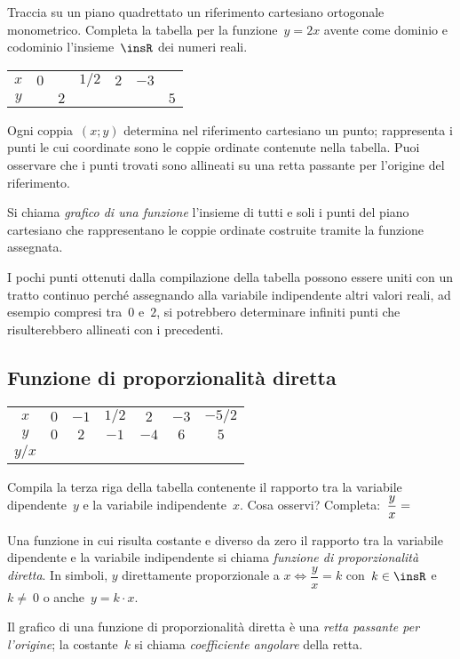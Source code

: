 \begin{exrig}
 \begin{esempio}
Traccia su un piano quadrettato un riferimento cartesiano ortogonale monometrico.
Completa la tabella per la funzione~$y=2x$ avente come dominio e codominio l'insieme~$\insR$ dei numeri reali.
\begin{center}
 \begin{tabular}{ccccccc}
 \toprule
 $x$ & $0$ && $1/2$ & $2$ & $-3$ &\\
 $y$ &&$2$&&&&$5$\\
 \bottomrule
 \end{tabular}
\end{center}
Ogni coppia~$(x;y)$ determina nel riferimento cartesiano un punto; rappresenta i punti le cui coordinate sono
le coppie ordinate contenute nella tabella. Puoi osservare che i punti trovati sono allineati su una retta passante
per l'origine del riferimento.
 \end{esempio}
\end{exrig}
\begin{definizione}
 Si chiama \emph{grafico di una funzione} l'insieme di tutti e soli i punti del piano cartesiano che
 rappresentano le coppie ordinate costruite tramite la funzione assegnata.
\end{definizione}
\osservazione
I pochi punti ottenuti dalla compilazione della tabella possono essere uniti con un tratto continuo perché
assegnando alla variabile indipendente altri valori reali, ad esempio compresi tra~$0$ e~$2$, si potrebbero
determinare infiniti punti che risulterebbero allineati con i precedenti.

\vspazio\ovalbox{\risolvii \ref{ese:D.37}, \ref{ese:D.38}}

\subsection{Funzione di proporzionalità diretta}
\begin{center}
 \begin{tabular}{ccccccc}
 \toprule
 $x$ & $0$ & $-1$ & $ 1/2$ & $2$ & $-3$ & $-5/2$\\
 $y$ & $0$ & $2$ & $-1$ & $-4$ & $6$ & $5$\\
 \midrule
 $y/x$ & & & & & & \\
 \bottomrule
 \end{tabular}
\end{center}
Compila la terza riga della tabella contenente il rapporto tra la variabile dipendente~$y$ e la variabile indipendente~$x$.
Cosa osservi? Completa:~$\dfrac{y}{x}=\dotfill$
\begin{definizione}
 Una funzione in cui risulta costante e diverso da zero il rapporto tra la variabile dipendente e la variabile indipendente
 si chiama \emph{funzione di proporzionalità diretta}. In simboli, $y$ direttamente proporzionale a
$x \Leftrightarrow \dfrac{y}{x}=k$ con~$k\in \insR$ e~$k\neq~0$ o anche~$y=k\cdot x$.
\end{definizione}
Il grafico di una funzione di proporzionalità diretta è una \emph{retta passante per l'origine};
la costante~$k$ si chiama \emph{coefficiente angolare} della retta.

